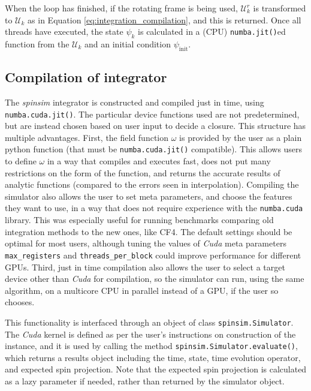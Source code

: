 \documentclass{jors}
\begin{document}
		When the loop has finished, if the rotating frame is being used, \(\mathcal{U}^r_k\) is transformed to \(\mathcal{U}_k\) as in Equation \eqref{eq:integration_compilation}, and this is returned.
		Once all threads have executed, the state \(\psi_k\) is calculated in a (CPU) \texttt{numba.jit()}ed function from the \(\mathcal{U}_k\) and an initial condition \(\psi_{\mathrm{init}}\).


	\subsection{Compilation of integrator}
		The \emph{spinsim} integrator is constructed and compiled just in time, using \texttt{numba.cuda.jit()}.
		The particular device functions used are not predetermined, but are instead chosen based on user input to decide a closure.
		This structure has multiple advantages.
		First, the field function \(\omega\) is provided by the user as a plain python function (that must be \texttt{numba.cuda.jit()} compatible).
		This allows users to define \(\omega\) in a way that compiles and executes fast, does not put many restrictions on the form of the function, and returns the accurate results of analytic functions (compared to the errors seen in interpolation).
		Compiling the simulator also allows the user to set meta parameters, and choose the features they want to use, in a way that does not require experience with the \texttt{numba.cuda} library.
		This was especially useful for running benchmarks comparing old integration methods to the new ones, like CF4.
		The default settings should be optimal for most users, although tuning the values of \emph{Cuda} meta parameters \texttt{max\_registers} and \texttt{threads\_per\_block} could improve performance for different GPUs.
		Third, just in time compilation also allows the user to select a target device other than \emph{Cuda} for compilation, so the simulator can run, using the same algorithm, on a multicore CPU in parallel instead of a GPU, if the user so chooses.
		
		This functionality is interfaced through an object of class \texttt{spinsim.Simulator}.
		The \emph{Cuda} kernel is defined as per the user’s instructions on construction of the instance, and it is used by calling the method \texttt{spinsim.Simulator.evaluate()}, which returns a results object including the time, state, time evolution operator, and expected spin projection.
		Note that the expected spin projection is calculated as a lazy parameter if needed, rather than returned by the simulator object.
\end{document}
